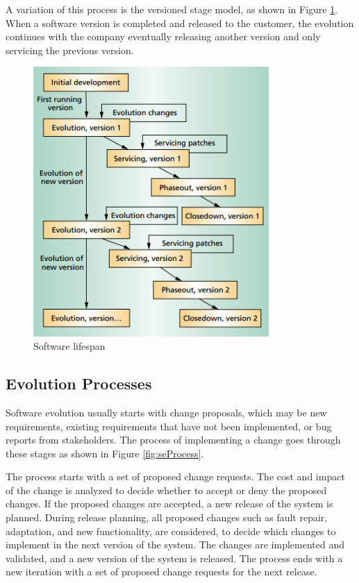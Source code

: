 A variation of this process is the versioned stage model, as shown in Figure \ref{fig:lifespan-2}. When a software version is completed and released to the customer, the evolution continues with the company eventually releasing another version and only servicing the previous version. 

\begin{figure}[ht!]
	\centering
	\includegraphics[width=0.8\textwidth]{images/lifespan-2.png}
	\caption{Software lifespan}
	\label{fig:lifespan-2}
\end{figure}

\subsection{Evolution Processes}
Software evolution usually starts with change proposals, which may be new requirements, existing requirements that have not been implemented, or bug reports from stakeholders. The process of implementing a change goes through these stages\cite{Sommerville:2011:SE} as shown in Figure \ref{fig:seProcess}.

The process starts with a set of proposed change requests. The cost and impact of the change is analyzed to decide whether to accept or deny the proposed changes. If the proposed changes are accepted, a new release of the system is planned. During release planning, all proposed changes such as fault repair, adaptation, and new functionality, are considered, to decide which changes to implement in the next version of the system. The changes are implemented and validated, and a new version of the system is released. The process ends with a new iteration with a set of proposed change requests for the next release. 

